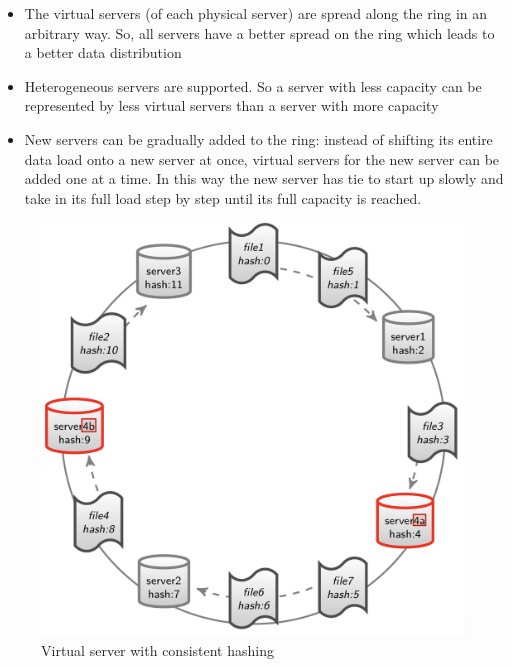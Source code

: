 \begin{itemize}
    \item The virtual servers (of each physical server) are spread along the ring in an arbitrary way. So, all servers have a better spread on the ring which leads to a better data distribution
    \item Heterogeneous servers are supported. So a server with less capacity can be represented by less virtual servers than a server with more capacity
    \item New servers can be gradually added to the ring: instead of shifting its entire data load onto a new server at once, virtual servers for the new server can be added one at a time. In this way the new server has tie to start up slowly and take in its full load step by step until its full capacity is reached.
\end{itemize}
\begin{figure}[!h]
        \centering
        \includegraphics[width=0.4\linewidth]{images/AdvancedDataManagment/data_fragmentation/virtual_servers.jpeg}
        \caption{Virtual server with consistent hashing}
    \end{figure}